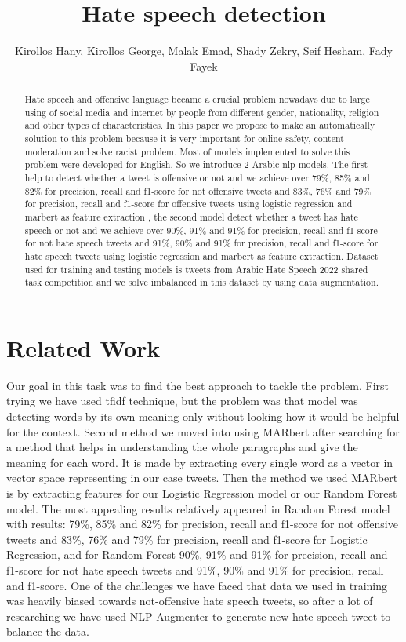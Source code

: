 \documentclass{IEEEtran}
\title{Hate speech detection}
\author{Kirollos Hany, Kirollos George, Malak Emad, Shady Zekry, Seif Hesham, Fady Fayek}
\date{}
\begin{document}
\maketitle

\begin{abstract}
Hate speech and offensive language became a crucial problem nowadays due to large using of social media and internet by people from different gender, nationality, religion and other types of characteristics. In this paper we propose to make an automatically solution to this problem because it is very important for online safety, content moderation and solve racist problem. Most of models implemented to solve this problem were developed for English. So we introduce 2 Arabic nlp models. The first help to detect whether a tweet is offensive or not and we achieve over 79\%, 85\% and 82\% for precision, recall and f1-score for not offensive tweets and 83\%, 76\% and 79\% for precision, recall and f1-score for offensive tweets using logistic regression and marbert as feature extraction , the second model detect whether a tweet has hate speech or not and we achieve over 90\%, 91\% and 91\% for precision, recall and f1-score for not hate speech tweets and 91\%, 90\% and 91\% for precision, recall and f1-score for  hate speech tweets using logistic regression and marbert as feature extraction. Dataset used for training and testing models is tweets from Arabic Hate Speech 2022 shared task competition and we solve imbalanced in this dataset by using data augmentation.
\end{abstract}

\section{Related Work}
Our goal in this task was to find the best approach to tackle the problem. First trying we have used tfidf technique, but the problem was that model was detecting words by its own meaning only without looking how it would be helpful for the context. Second method we moved into using MARbert after searching for a method that helps in understanding the whole paragraphs and give the meaning for each word. It is made by extracting every single word as a vector in vector space representing in our case tweets. Then the method we used MARbert is by extracting features for our Logistic Regression model or our Random Forest model. The most appealing results relatively appeared in Random Forest model with results: 79\%, 85\% and 82\% for precision, recall and f1-score for not offensive tweets and 83\%, 76\% and 79\% for precision, recall and f1-score for Logistic Regression, and for Random Forest 90\%, 91\% and 91\% for precision, recall and f1-score for not hate speech tweets and 91\%, 90\% and 91\% for precision, recall and f1-score. One of the challenges we have faced that data we used in training was heavily biased towards not-offensive hate speech tweets, so after a lot of researching we have used NLP Augmenter to generate new hate speech tweet to balance the data.
\end{document}
